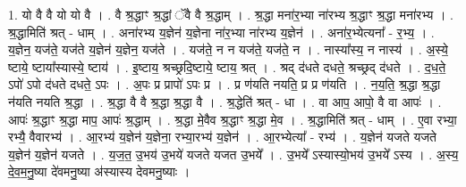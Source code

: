\documentclass[17pt]{extarticle}
\begin{document}
1. यो वै वै यो यो वै । . वै श्र॒द्धाꣳ श्र॒द्धां ॅवै वै श्र॒द्धाम् । . श्र॒द्धा मना॑र॒भ्या ना॑रभ्य श्र॒द्धाꣳ श्र॒द्धा मना॑रभ्य । . श्र॒द्धामिति॑ श्रत् - धाम् । . अना॑रभ्य य॒ज्ञेन॑ य॒ज्ञेना ना॑र॒भ्या ना॑रभ्य य॒ज्ञेन॑ । . अना॑र॒भ्येत्यना᳚ - र॒भ्य॒ । . य॒ज्ञेन॒ यज॑ते॒ यज॑ते य॒ज्ञेन॑ य॒ज्ञेन॒ यज॑ते । . यज॑ते॒ न न यज॑ते॒ यज॑ते॒ न । . नास्या᳚स्य॒ न नास्य॑ । . अ॒स्ये॒ ष्टाये॒ ष्टाया᳚स्यास्ये॒ ष्टाय॑ । . इ॒ष्टाय॒ श्रच्छ्रदि॒ष्टाये॒ ष्टाय॒ श्रत् । . श्रद् द॑धते दधते॒ श्रच्छ्रद् द॑धते । . द॒ध॒ते॒ ऽपो॑ ऽपो द॑धते दधते॒ ऽपः । . अ॒पः प्र प्रापो॑ ऽपः प्र । . प्र ण॑यति नयति॒ प्र प्र ण॑यति । . न॒य॒ति॒ श्र॒द्धा श्र॒द्धा न॑यति नयति श्र॒द्धा । . श्र॒द्धा वै वै श्र॒द्धा श्र॒द्धा वै । . श्र॒द्धेति॑ श्रत् - धा । . वा आप॒ आपो॒ वै वा आपः॑ । . आपः॑ श्र॒द्धाꣳ श्र॒द्धा माप॒ आपः॑ श्र॒द्धाम् । . श्र॒द्धा मे॒वैव श्र॒द्धाꣳ श्र॒द्धा मे॒व । . श्र॒द्धामिति॑ श्रत् - धाम् । . ए॒वा रभ्या॒ रभ्यै॒ वैवारभ्य॑ । . आ॒रभ्य॑ य॒ज्ञेन॑ य॒ज्ञेना॒ रभ्या॒रभ्य॑ य॒ज्ञेन॑ । . आ॒रभ्येत्या᳚ - रभ्य॑ । . य॒ज्ञेन॑ यजते यजते य॒ज्ञेन॑ य॒ज्ञेन॑ यजते । . य॒ज॒त॒ उ॒भय॑ उ॒भये॑ यजते यजत उ॒भये᳚ । . उ॒भये᳚ ऽस्यास्यो॒भय॑ उ॒भये᳚ ऽस्य । . अ॒स्य॒ दे॒व॒म॒नु॒ष्या दे॑वमनु॒ष्या अ॑स्यास्य देवमनु॒ष्याः । \newline
\end{document}
